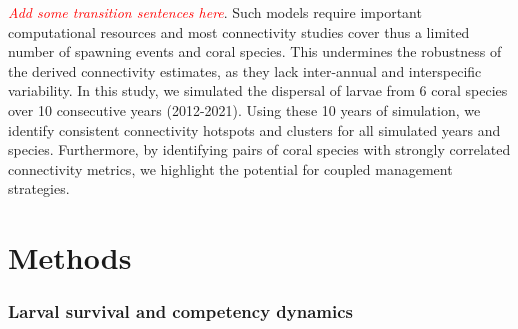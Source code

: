 \documentclass[preprint,12pt,authoryear]{elsarticle}
\newcommand{\emphc}[1]{\emph{\textcolor{red}{#1}}}
\begin{document}
\emphc{Add some transition sentences here}. Such models require important computational resources and most connectivity studies cover thus a limited number of spawning events and coral species. This undermines the robustness of the derived connectivity estimates, as they lack inter-annual and interspecific variability. In this study, we simulated the dispersal of larvae from 6 coral species over 10 consecutive years (2012-2021). Using these 10 years of simulation, we identify consistent connectivity hotspots and clusters for all simulated years and species. Furthermore, by identifying pairs of coral species with strongly correlated connectivity metrics, we highlight the potential for coupled management strategies.


\section*{Methods}

\subsubsection*{Larval survival and competency dynamics}
\end{document}
